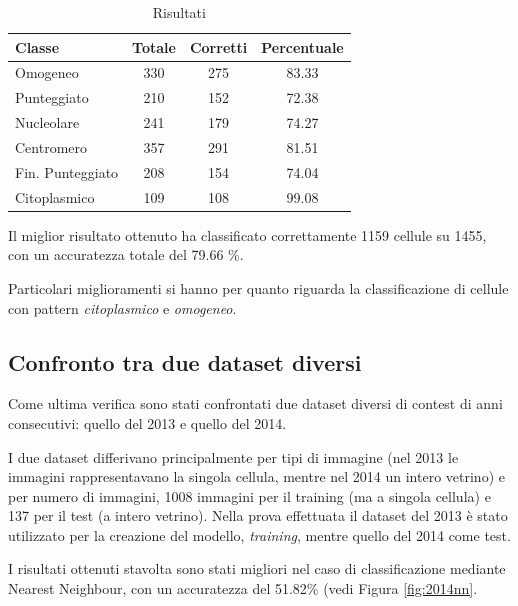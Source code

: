 \begin{table}[H]
\centering
\footnotesize
\begin{tabular}{|l | c | c | c |} 
 \hline 
 \textbf{Classe} &  \textbf{Totale} & \textbf{Corretti} & \textbf{Percentuale} \\ [0.5ex] 
 \hline\hline
 Omogeneo & 330 & 275 & 83.33\\
 Punteggiato & 210 & 152 & 72.38\\
 Nucleolare & 241 & 179 & 74.27\\
 Centromero & 357 & 291 & 81.51\\
 Fin. Punteggiato & 208 & 154 & 74.04\\
 Citoplasmico & 109 & 108 & 99.08\\
 \hline
\end{tabular}
\caption{Risultati}
\label{table:2}
\end{table}


Il miglior risultato ottenuto ha classificato correttamente 1159 cellule su 1455, con un accuratezza totale del 79.66 \%.

Particolari miglioramenti si hanno per quanto riguarda la classificazione di cellule con pattern \emph{citoplasmico} e \emph{omogeneo}.


\subsection{Confronto tra due dataset diversi}

Come ultima verifica sono stati confrontati due dataset diversi di contest di anni consecutivi: quello del 2013 e quello del 2014.

I due dataset differivano principalmente per tipi di immagine (nel 2013 le immagini rappresentavano la singola cellula, mentre nel 2014 un intero vetrino) e per numero di immagini, 1008 immagini per il training (ma a singola cellula) e 137 per il test (a intero vetrino). Nella prova effettuata il dataset del 2013 è stato utilizzato per la creazione del modello, \emph{training}, mentre quello del 2014 come test.

I risultati ottenuti stavolta sono stati migliori nel caso di classificazione mediante Nearest Neighbour, con un accuratezza del 51.82\% (vedi Figura \ref{fig:2014nn}.

